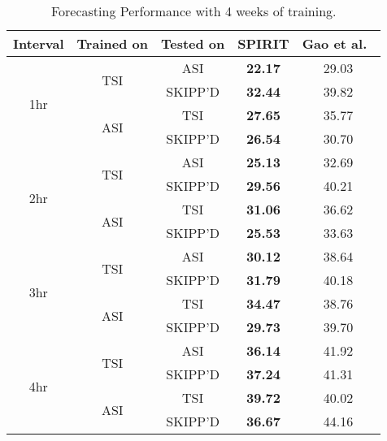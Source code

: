\begin{table}[h]
  \caption{
  Forecasting Performance with 4 weeks of training.
  }
  \label{tab:fourweek_forecast}
  \centering
  \setlength{\tabcolsep}{2pt}
  \renewcommand{\arraystretch}{1.2} 
  \begin{tabular}{c c c c c}
    \hline
    \textbf{Interval} & \textbf{Trained on} & \textbf{Tested on} & \textbf{SPIRIT} & \textbf{Gao et al.~\cite{wacv2022}} \\
    \hline
    \multirow{4}{*}{1hr} & \multirow{2}{*}{TSI} & ASI & \textbf{22.17} & 29.03 \\
                          & & SKIPP'D & \textbf{32.44} & 39.82 \\
                          \cline{2-5}
                          & \multirow{2}{*}{ASI} & TSI & \textbf{27.65} & 35.77 \\
                          & & SKIPP'D & \textbf{26.54} & 30.70 \\
    \hline
    \multirow{4}{*}{2hr} & \multirow{2}{*}{TSI} & ASI & \textbf{25.13} & 32.69 \\
                          & & SKIPP'D & \textbf{29.56} & 40.21 \\
                          \cline{2-5}
                          & \multirow{2}{*}{ASI} & TSI & \textbf{31.06} & 36.62 \\
                          & & SKIPP'D & \textbf{25.53} & 33.63 \\
    \hline
    \multirow{4}{*}{3hr} & \multirow{2}{*}{TSI} & ASI & \textbf{30.12} & 38.64 \\
                          & & SKIPP'D & \textbf{31.79} & 40.18 \\
                          \cline{2-5}
                          & \multirow{2}{*}{ASI} & TSI & \textbf{34.47} & 38.76 \\
                          & & SKIPP'D & \textbf{29.73} & 39.70 \\
    \hline
    \multirow{4}{*}{4hr} & \multirow{2}{*}{TSI} & ASI & \textbf{36.14} & 41.92 \\
                          & & SKIPP'D & \textbf{37.24} & 41.31 \\
                          \cline{2-5}
                          & \multirow{2}{*}{ASI} & TSI & \textbf{39.72} & 40.02 \\
                          & & SKIPP'D & \textbf{36.67} & 44.16 \\
    \hline
  \end{tabular}
\end{table}

